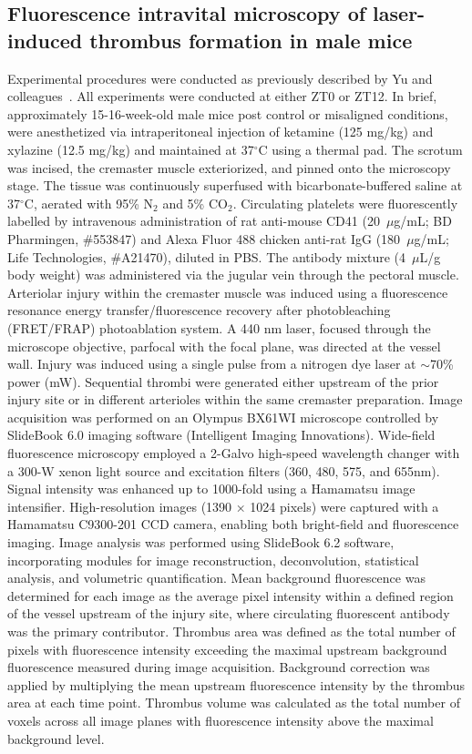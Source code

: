 \documentclass[12pt]{article}
\begin{document}
\subsection*{Fluorescence intravital microscopy of laser-induced thrombus formation in male mice}

Experimental procedures were conducted as previously described by Yu and colleagues~\cite{ref142}. 
All experiments were conducted at either ZT0 or ZT12. 
In brief, approximately 15-16-week-old male mice post control or misaligned conditions, were anesthetized via intraperitoneal injection of ketamine (125 mg/kg) and xylazine (12.5 mg/kg) and maintained at 37$^{\circ}$C using a thermal pad. 
The scrotum was incised, the cremaster muscle exteriorized, and pinned onto the microscopy stage. 
The tissue was continuously superfused with bicarbonate-buffered saline at 37$^{\circ}$C, aerated with 95\% N$_2$ and 5\% CO$_2$. 
Circulating platelets were fluorescently labelled by intravenous administration of rat anti-mouse CD41 (20~$\mu$g/mL; BD Pharmingen, \#553847) and Alexa Fluor 488 chicken anti-rat IgG (180~$\mu$g/mL; Life Technologies, \#A21470), diluted in PBS. 
The antibody mixture (4~$\mu$L/g body weight) was administered via the jugular vein through the pectoral muscle.
Arteriolar injury within the cremaster muscle was induced using a fluorescence resonance energy transfer/fluorescence recovery after photobleaching (FRET/FRAP) photoablation system. 
A 440 nm laser, focused through the microscope objective, parfocal with the focal plane, was directed at the vessel wall. 
Injury was induced using a single pulse from a nitrogen dye laser at $\sim$70\% power (mW).
Sequential thrombi were generated either upstream of the prior injury site or in different arterioles within the same cremaster preparation. 
Image acquisition was performed on an Olympus BX61WI microscope controlled by SlideBook 6.0 imaging software (Intelligent Imaging Innovations). 
Wide-field fluorescence microscopy employed a 2-Galvo high-speed wavelength changer with a 300-W xenon light source and excitation filters (360, 480, 575, and 655nm).
Signal intensity was enhanced up to 1000-fold using a Hamamatsu image intensifier. 
High-resolution images (1390 × 1024 pixels) were captured with a Hamamatsu C9300-201 CCD camera, enabling both bright-field and fluorescence imaging. 
Image analysis was performed using SlideBook 6.2 software, incorporating modules for image reconstruction, deconvolution, statistical analysis, and volumetric quantification.
Mean background fluorescence was determined for each image as the average pixel intensity within a defined region of the vessel upstream of the injury site, where circulating fluorescent antibody was the primary contributor.
Thrombus area was defined as the total number of pixels with fluorescence intensity exceeding the maximal upstream background fluorescence measured during image acquisition.
Background correction was applied by multiplying the mean upstream fluorescence intensity by the thrombus area at each time point.
Thrombus volume was calculated as the total number of voxels across all image planes with fluorescence intensity above the maximal background level.
\end{document}
